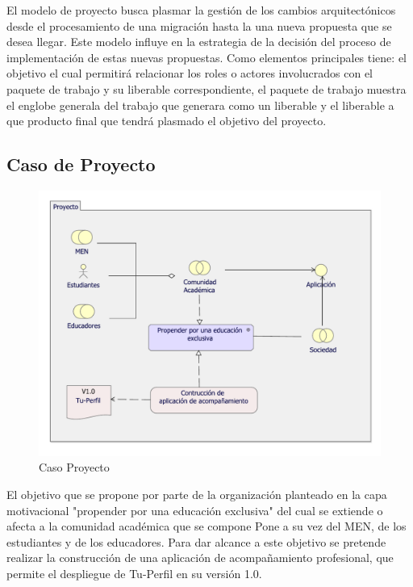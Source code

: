 El modelo de proyecto busca plasmar la gestión de los cambios arquitectónicos desde el procesamiento de una migración hasta la una nueva propuesta que se desea llegar. Este modelo influye en la estrategia de la decisión  del proceso de implementación de estas nuevas propuestas. Como elementos principales tiene: el objetivo el cual permitirá relacionar los roles o actores involucrados con el paquete de trabajo y su liberable correspondiente, el paquete de trabajo muestra el englobe generala del trabajo que generara como un liberable y el liberable a que producto final que tendrá plasmado el objetivo del proyecto.

\subsection{Caso  de Proyecto}
\begin{figure}[h!]
	\centering
	\includegraphics[width=.9\linewidth]{imgs/caso/proyecto/proyecto.pdf}
	\caption{Caso Proyecto}
\end{figure}
El objetivo que se propone por parte de la organización planteado en la capa motivacional "propender por una educación exclusiva" del cual se extiende o afecta a la comunidad académica que se compone Pone a su vez del MEN, de los estudiantes y de los educadores. Para dar alcance a este objetivo se pretende realizar la construcción de una aplicación de acompañamiento profesional, que permite el despliegue de Tu-Perfil en su versión 1.0.